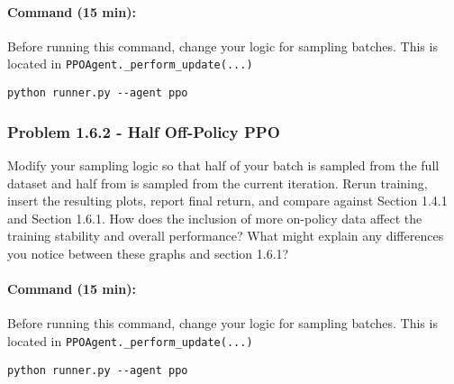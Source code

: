 \documentclass[12pt]{article}
\begin{document}
\paragraph{Command (15 min):} Before running this command, change your logic for sampling batches.  This is located in \texttt{PPOAgent.\_perform\_update(...)}
\begin{verbatim}
python runner.py --agent ppo
\end{verbatim}

\begin{solution}[height=5cm]
\end{solution}
\subsubsection*{Problem 1.6.2 - Half Off-Policy PPO}
Modify your sampling logic so that half of your batch is sampled from the full dataset and half from is sampled from the current iteration.  Rerun training, insert the resulting plots, report final return, and compare against Section 1.4.1 and Section 1.6.1. How does the inclusion of more on-policy data affect the training stability and overall performance?  What might explain any differences you notice between these graphs and section 1.6.1?

\paragraph{Command (15 min):} Before running this command, change your logic for sampling batches.  This is located in \texttt{PPOAgent.\_perform\_update(...)}
\begin{verbatim}
python runner.py --agent ppo
\end{verbatim}

\begin{solution}[height=5cm]
\end{solution}



\end{document}
